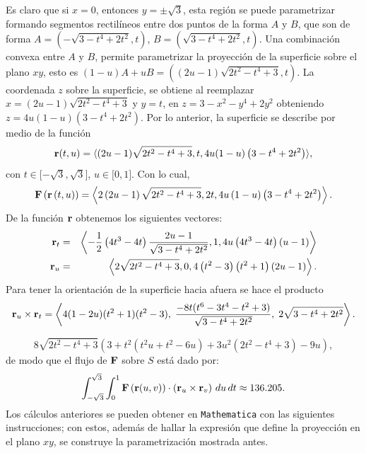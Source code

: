 Es claro que si $x=0$, entonces $y=\pm \sqrt{3}$, esta región se puede parametrizar formando segmentos rectilíneos entre dos puntos de la forma $A$ y $B$, que son de forma $A=\left( -\sqrt{3-t^{4}+2t^{2}},t\right)$, $B=\left( \sqrt{3-t^{4}+2t^{2}},t\right)$. Una combinación convexa entre $A$ y $B$, permite parametrizar la proyección de la superficie sobre el plano $xy$, esto es $\left( 1-u\right)A+uB=\left(\left(2u-1\right)\sqrt{2t^{2}-t^{4}+3},t\right)$. La coordenada $z$ sobre la superficie, se obtiene al reemplazar $x=(2u-1)\sqrt{2t^{2}-t^{4}+3}$ y $y=t$, en $z=3-x^{2}-y^{4}+2y^{2}$ obteniendo $z=4u(1-u)(3-t^{4}+2t^{2})$. Por lo anterior, la superficie se describe por medio de la función
\[{\bf r}(t,u) =\langle (2u-1) \sqrt{2t^{2}-t^{4}+3},t,4u(1-u)\left(3-t^{4}+2t^{2}\right)\rangle,\]
con $t\in \lbrack -\sqrt{3},\sqrt{3}]$, $u\in \lbrack 0,1]$.
Con lo cual,
\[{\bf F}\left({\bf r}\left(t,u\right) \right) =\left\langle 2\left( 2u-1\right) \sqrt{2t^{2}-t^{4}+3},2t,4u\left( 1-u\right) \left( 3-t^{4}+2t^{2}\right)\right\rangle.\]
De la función $\bf  {r}$ obtenemos los siguientes vectores:
\begin{eqnarray*}
{\bf r}_{t}&=& \left\langle -\frac{1}{2}\left( 4t^{3}-4t\right) \frac{2u-1}{\sqrt{3-t^{4}+2t^{2}}},1,4u\left( 4t^{3}-4t\right) \left( u-1\right) \right\rangle \\
{\bf r}_{u}&=& \left\langle 2\sqrt{2t^{2}-t^{4}+3},0,4\left( t^{2}-3\right)
\left( t^{2}+1\right) \left( 2u-1\right)  \right\rangle.
\end{eqnarray*}
Para tener la orientación de la superficie hacia afuera se hace el producto
\begin{gather*}
{\bf r}_{u} \times {\bf r}_{t} = \left\langle 4(1 - 2u)(t^{2} + 1)(t^{2} - 3),\;
\frac{-8t(t^6 - 3t^4 - t^2 + 3)}{\sqrt{3 - t^{4} + 2t^{2}}},\;
2\sqrt{3 - t^{4} + 2t^{2}} \right\rangle.
\end{gather*}

\[
8\sqrt{2t^{2} - t^{4} + 3} \left(3 + t^2(t^2u + t^2 - 6u) + 3u^2(2t^{2} - t^{4} + 3) - 9u\right),
\]
de modo que el flujo de ${\bf F}$ sobre $S$ está dado por:
\[
\int_{-\sqrt{3}}^{\sqrt{3}} \int_{0}^{1}{\bf F}\left({\bf r}(u,v)\right) \cdot
\left({\bf r}_{u} \times {\bf r}_{v}\right)\, du\, dt \approx 136.205.
\]
Los cálculos anteriores se pueden obtener en \verb|Mathematica| con las siguientes instrucciones; con estos, además de hallar la expresión que define la proyección en el plano $xy$, se construye la parametrización mostrada antes.

